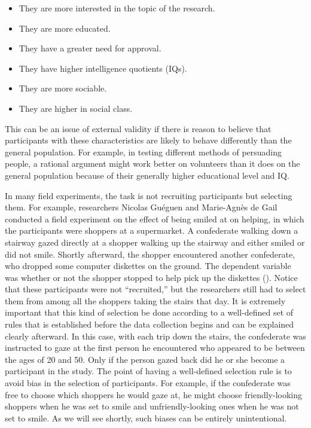 \documentclass[
]{krantz}
\providecommand{\tightlist}{%
  \setlength{\itemsep}{0pt}\setlength{\parskip}{0pt}}
\begin{document}
\begin{itemize}
\tightlist
\item
  They are more interested in the topic of the research.
\item
  They are more educated.
\item
  They have a greater need for approval.
\item
  They have higher intelligence quotients (IQs).
\item
  They are more sociable.
\item
  They are higher in social class.
\end{itemize}

This can be an issue of external validity if there is reason to believe that participants with these characteristics are likely to behave differently than the general population. For example, in testing different methods of persuading people, a rational argument might work better on volunteers than it does on the general population because of their generally higher educational level and IQ.

In many field experiments, the task is not recruiting participants but selecting them. For example, researchers Nicolas Guéguen and Marie-Agnès de Gail conducted a field experiment on the effect of being smiled at on helping, in which the participants were shoppers at a supermarket. A confederate walking down a stairway gazed directly at a shopper walking up the stairway and either smiled or did not smile. Shortly afterward, the shopper encountered another confederate, who dropped some computer diskettes on the ground. The dependent variable was whether or not the shopper stopped to help pick up the diskettes (). Notice that these participants were not ``recruited,'' but the researchers still had to select them from among all the shoppers taking the stairs that day. It is extremely important that this kind of selection be done according to a well-defined set of rules that is established before the data collection begins and can be explained clearly afterward. In this case, with each trip down the stairs, the confederate was instructed to gaze at the first person he encountered who appeared to be between the ages of 20 and 50. Only if the person gazed back did he or she become a participant in the study. The point of having a well-defined selection rule is to avoid bias in the selection of participants. For example, if the confederate was free to choose which shoppers he would gaze at, he might choose friendly-looking shoppers when he was set to smile and unfriendly-looking ones when he was not set to smile. As we will see shortly, such biases can be entirely unintentional.
\end{document}
